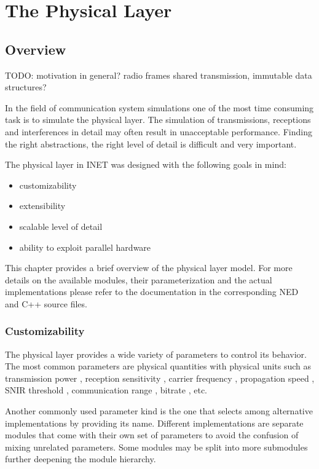 \chapter{The Physical Layer}
\label{cha:physicallayer}

\section{Overview}

TODO: motivation in general? radio frames shared transmission, immutable data structures?

In the field of communication system simulations one of the most time consuming
task is to simulate the physical layer. The simulation of transmissions, receptions
and interferences in detail may often result in unacceptable performance. Finding
the right abstractions, the right level of detail is difficult and very important.

The physical layer in INET was designed with the following goals in mind:
\begin{itemize}
  \item customizability
  \item extensibility
  \item scalable level of detail
  \item ability to exploit parallel hardware
\end{itemize}

This chapter provides a brief overview of the physical layer model. For more
details on the available modules, their parameterization and the actual
implementations please refer to the documentation in the corresponding NED and
C++ source files.

\subsection{Customizability}

The physical layer provides a wide variety of parameters to control its behavior.
The most common parameters are physical quantities with physical units such as
transmission power \ttt{[W]}, reception sensitivity \ttt{[W]}, carrier frequency
\ttt{[Hz]}, propagation speed \ttt{[m/s]}, SNIR threshold \ttt{[dB]}, communication
range \ttt{[m]}, bitrate \ttt{[b/s]}, etc. 

Another commonly used parameter kind is the one that selects among alternative
implementations by providing its name. Different implementations are separate
modules that come with their own set of parameters to avoid the confusion of
mixing unrelated parameters. Some modules may be split into more submodules 
further deepening the module hierarchy.

